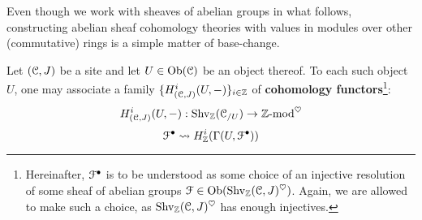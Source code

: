             \begin{remark}
                Even though we work with sheaves of abelian groups in what follows, constructing abelian sheaf cohomology theories with values in modules over other (commutative) rings is a simple matter of base-change. 
            \end{remark}
            \begin{definition} \label{def: sheaf_cohomology_on_sites}
                Let $(\mathcal{C}, J)$ be a site and let $U \in \mathrm{Ob}(\mathcal{C})$ be an object thereof. To each such object $U$, one may associate a family $\{H^i_{(\mathcal{C}, J)}(U, -)\}_{i \in \mathbb{Z}}$ of \textbf{cohomology functors}\footnote{Hereinafter, $\mathcal{F}^{\bullet}$ is to be understood as some choice of an injective resolution of some sheaf of abelian groups $\mathcal{F} \in \mathrm{Ob}(\mathrm{Shv}_{\mathbb{Z}}(\mathcal{C}, J)^{\heartsuit})$. Again, we are allowed to make such a choice, as $\mathrm{Shv}_{\mathbb{Z}}(\mathcal{C}, J)^{\heartsuit}$ has enough injectives.}:
                    $$H^i_{(\mathcal{C}, J)}(U, -): \mathrm{Shv}_{\mathbb{Z}}(\mathcal{C}_{/U}) \to \mathbb{Z}\text{-}\mathrm{mod}^{\heartsuit}$$
                    $$\mathcal{F}^{\bullet} \leadsto H^i_{\mathbb{Z}}(\Gamma(U, \mathcal{F}^{\bullet}))$$
            \end{definition}
